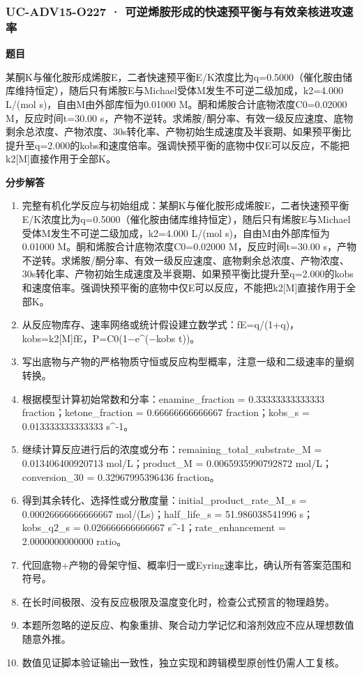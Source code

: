 \documentclass[UTF8,11pt,a4paper]{ctexart}
\begin{document}
\subsubsection*{UC-ADV15-O227 · 可逆烯胺形成的快速预平衡与有效亲核进攻速率}
\noindent\textbf{题目}\par
某酮K与催化胺形成烯胺E，二者快速预平衡E/K浓度比为q=0.5000（催化胺由储库维持恒定），随后只有烯胺E与Michael受体M发生不可逆二级加成，k2=4.000 L/(mol s)，自由M由外部库恒为0.01000 M。酮和烯胺合计底物浓度C0=0.02000 M，反应时间t=30.00 s，产物不逆转。求烯胺/酮分率、有效一级反应速度、底物剩余总浓度、产物浓度、30s转化率、产物初始生成速度及半衰期、如果预平衡比提升至q=2.000的kobs和速度倍率。强调快预平衡的底物中仅E可以反应，不能把k2[M]直接作用于全部K。\par
\medskip\noindent\textbf{分步解答}
\begin{enumerate}
\item 完整有机化学反应与初始组成：某酮K与催化胺形成烯胺E，二者快速预平衡E/K浓度比为q=0.5000（催化胺由储库维持恒定），随后只有烯胺E与Michael受体M发生不可逆二级加成，k2=4.000 L/(mol s)，自由M由外部库恒为0.01000 M。酮和烯胺合计底物浓度C0=0.02000 M，反应时间t=30.00 s，产物不逆转。求烯胺/酮分率、有效一级反应速度、底物剩余总浓度、产物浓度、30s转化率、产物初始生成速度及半衰期、如果预平衡比提升至q=2.000的kobs和速度倍率。强调快预平衡的底物中仅E可以反应，不能把k2[M]直接作用于全部K。
\item 从反应物库存、速率网络或统计假设建立数学式：fE=q/(1+q)，kobs=k2[M]fE，P=C0(1−e\textasciicircum{}(−kobs t))。
\item 写出底物与产物的严格物质守恒或反应构型概率，注意一级和二级速率的量纲转换。
\item 根据模型计算初始常数和分率：enamine\_fraction = 0.33333333333333 fraction；ketone\_fraction = 0.66666666666667 fraction；kobs\_s = 0.013333333333333 s\textasciicircum{}-1。
\item 继续计算反应进行后的浓度或分布：remaining\_total\_substrate\_M = 0.013406400920713 mol/L；product\_M = 0.0065935990792872 mol/L；conversion\_30 = 0.32967995396436 fraction。
\item 得到其余转化、选择性或分散度量：initial\_product\_rate\_M\_s = 0.00026666666666667 mol/(Ls)；half\_life\_s = 51.986038541996 s；kobs\_q2\_s = 0.026666666666667 s\textasciicircum{}-1；rate\_enhancement = 2.0000000000000 ratio。
\item 代回底物+产物的骨架守恒、概率归一或Eyring速率比，确认所有答案范围和符号。
\item 在长时间极限、没有反应极限及温度变化时，检查公式预言的物理趋势。
\item 本题所忽略的逆反应、构象重排、聚合动力学记忆和溶剂效应不应从理想数值随意外推。
\item 数值见证脚本验证输出一致性，独立实现和跨辑模型原创性仍需人工复核。
\end{enumerate}
\end{document}
